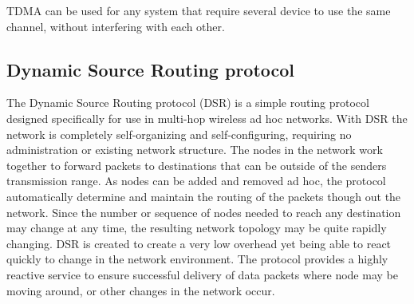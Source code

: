 TDMA can be used for any system that require several device to use the same channel, without interfering with each other.





\subsection{Dynamic Source Routing protocol}
The Dynamic Source Routing protocol (DSR) is a simple routing protocol designed specifically for use in multi-hop wireless ad hoc networks.
With DSR the network is completely self-organizing and self-configuring, requiring no administration or existing network structure.
The nodes in the network work together to forward packets to destinations that can be outside of the senders transmission range.
As nodes can be added and removed ad hoc, the protocol automatically determine and maintain the routing of the packets though out the network.
Since the number or sequence of nodes needed to reach any destination may change at any time, the resulting network topology may be quite rapidly changing.
DSR is created to create a very low overhead yet being able to react quickly to change in the network environment.
The protocol provides a highly reactive service to ensure successful delivery of data packets where node may be moving around, or other changes in the network occur\cite{DSR}. 


